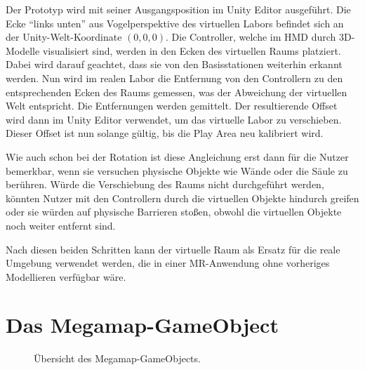 Der Prototyp wird mit seiner Ausgangsposition im Unity Editor ausgeführt.
Die Ecke \enquote{links unten} aus Vogelperspektive des virtuellen Labors befindet sich an der Unity-Welt-Koordinate $(0, 0, 0)$.
Die Controller, welche im HMD durch 3D-Modelle visualisiert sind, werden in den Ecken des virtuellen Raums platziert.
Dabei wird darauf geachtet, dass sie von den Basisstationen weiterhin erkannt werden.
Nun wird im realen Labor die Entfernung von den Controllern zu den entsprechenden Ecken des Raums gemessen, was der Abweichung der virtuellen Welt entspricht.
Die Entfernungen werden gemittelt.
Der resultierende Offset wird dann im Unity Editor verwendet, um das virtuelle Labor zu verschieben.
Dieser Offset ist nun solange gültig, bis die Play Area neu kalibriert wird.

Wie auch schon bei der Rotation ist diese Angleichung erst dann für die Nutzer bemerkbar, wenn sie versuchen physische Objekte wie Wände oder die Säule zu berühren.
Würde die Verschiebung des Raums nicht durchgeführt werden, könnten Nutzer mit den Controllern durch die virtuellen Objekte hindurch greifen oder sie würden auf physische Barrieren stoßen, obwohl die virtuellen Objekte noch weiter entfernt sind.

Nach diesen beiden Schritten kann der virtuelle Raum als Ersatz für die reale Umgebung verwendet werden, die in einer MR-Anwendung ohne vorheriges Modellieren verfügbar wäre.

\section{Das Megamap-GameObject}
\begin{figure}[t]
    \centering
    \caption{Übersicht des Megamap-GameObjects.}
    \label{fig:unity_megamap_object}
\end{figure}

